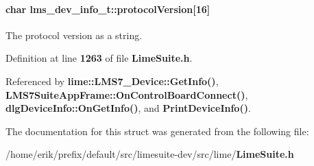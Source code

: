 \paragraph[{protocol\+Version}]{\setlength{\rightskip}{0pt plus 5cm}char lms\+\_\+dev\+\_\+info\+\_\+t\+::protocol\+Version[16]}\label{structlms__dev__info__t_ae79f5bece5767d5ca756c9aec8b4c8fa}


The protocol version as a string. 



Definition at line {\bf 1263} of file {\bf Lime\+Suite.\+h}.



Referenced by {\bf lime\+::\+L\+M\+S7\+\_\+\+Device\+::\+Get\+Info()}, {\bf L\+M\+S7\+Suite\+App\+Frame\+::\+On\+Control\+Board\+Connect()}, {\bf dlg\+Device\+Info\+::\+On\+Get\+Info()}, and {\bf Print\+Device\+Info()}.



The documentation for this struct was generated from the following file\+:\begin{DoxyCompactItemize}
\item 
/home/erik/prefix/default/src/limesuite-\/dev/src/lime/{\bf Lime\+Suite.\+h}\end{DoxyCompactItemize}
